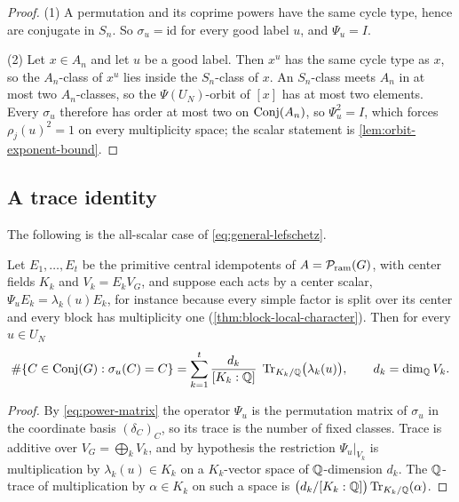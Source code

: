 \begin{proof}
(1)  A permutation and its coprime powers have the same cycle type, hence
are conjugate in \(S_n\).  So \(\sigma_u=\mathrm{id}\) for every good label
\(u\), and \(\Psi_u=I\).

(2)  Let \(x\in A_n\) and let \(u\) be a good label.  Then \(x^u\) has the
same cycle type as \(x\), so the \(A_n\)-class of \(x^u\) lies inside the
\(S_n\)-class of \(x\).  An \(S_n\)-class meets \(A_n\) in at most two
\(A_n\)-classes, so the \(\Psi(U_N)\)-orbit of \([x]\) has at most two
elements.  Every \(\sigma_u\) therefore has order at most two on
\(\operatorname{Conj}(A_n)\), so \(\Psi_u^2=I\), which forces \(\rho_j(u)^2=1\) on every
multiplicity space; the scalar statement is
\cref{lem:orbit-exponent-bound}.
\end{proof}

\subsection{A trace identity}

The following is the all-scalar case of \eqref{eq:general-lefschetz}.

\begin{proposition}
\label{prop:lefschetz}
Let \(E_1,\dots,E_t\) be the primitive central idempotents of
\(A=\mathcal P_{\mathrm{ram}}(G)\), with center fields \(K_k\) and \(V_k=E_kV_G\), and suppose
each acts by a center scalar, \(\Psi_uE_k=\lambda_k(u)E_k\), for instance
because every simple factor is split over its center and every block has
multiplicity one (\cref{thm:block-local-character}).  Then for every
\(u\in U_N\)
\begin{equation}
 \#\{C\in\operatorname{Conj}(G):\sigma_u(C)=C\}
 =\sum_{k=1}^{t}\frac{d_k}{[K_k:\mathbb Q]}\;
 \operatorname{Tr}_{K_k/\mathbb Q}\bigl(\lambda_k(u)\bigr),
 \qquad d_k=\dim_\mathbb Q V_k .
 \label{eq:lefschetz}
\end{equation}
\end{proposition}

\begin{proof}
By \eqref{eq:power-matrix} the operator \(\Psi_u\) is the permutation matrix
of \(\sigma_u\) in the coordinate basis \((\delta_C)_C\), so its trace is the
number of fixed classes.  Trace is additive over
\(V_G=\bigoplus_kV_k\), and by hypothesis the
restriction \(\Psi_u|_{V_k}\) is multiplication by \(\lambda_k(u)\in K_k\) on
a \(K_k\)-vector space of \(\mathbb Q\)-dimension \(d_k\).  The \(\mathbb Q\)-trace of
multiplication by \(\alpha\in K_k\) on such a space is
\(\bigl(d_k/[K_k:\mathbb Q]\bigr)\operatorname{Tr}_{K_k/\mathbb Q}(\alpha)\).
\end{proof}

